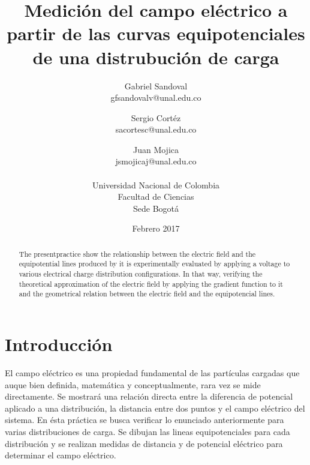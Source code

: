 \documentclass[10pt,twocolumn]{article}
\title{Medición del campo el\'ectrico a partir de las curvas equipotenciales de una distrubuci\'on de carga}
\author{Gabriel Sandoval \\ gfsandovalv@unal.edu.co \and Sergio Cortéz \\sacortesc@unal.edu.co \and Juan Mojica \\jsmojicaj@unal.edu.co\\ \\Universidad Nacional de Colombia\\Facultad de Ciencias \\ Sede Bogotá}
\date{Febrero 2017}
\begin{document}
\maketitle{}
\begin{abstract}
The presentpractice show the relationship between the electric field and the equipotential lines produced by it is experimentally evaluated by applying a voltage to various electrical charge distribution configurations. In that way, verifying the theoretical approximation of the electric field by applying the gradient function to it and the geometrical relation between the electric field and the equipotencial lines.
\end{abstract}

\section{Introducción}
El campo eléctrico es una propiedad fundamental de las partículas cargadas que auque bien definida, matemática y conceptualmente, rara vez se mide directamente. Se mostrará una relación directa entre la diferencia de potencial aplicado a una distribución, la distancia entre dos puntos y el campo eléctrico del sistema.
En ésta práctica se busca verificar lo enunciado anteriormente para varias  distribuciones de carga. Se dibujan las lineas equipotenciales para cada distribución y se realizan medidas de distancia y de potencial eléctrico para determinar el campo eléctrico.
\end{document}

